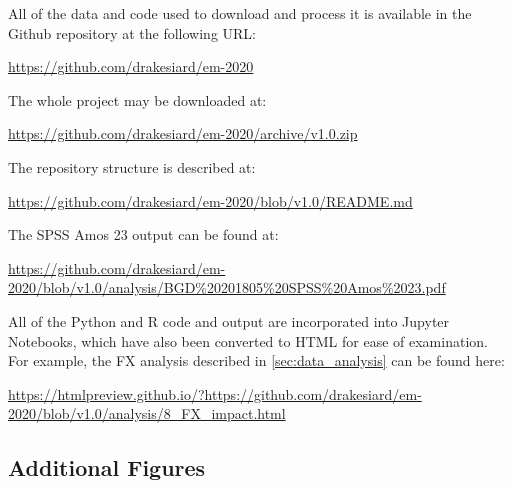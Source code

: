 \documentclass[11pt,a4paper]{article}
\begin{document}
All of the data and code used to download and process it is available in the Github repository at the following URL:

\url{https://github.com/drakesiard/em-2020}

\noindent
The whole project may be downloaded at:

\url{https://github.com/drakesiard/em-2020/archive/v1.0.zip}

\noindent
The repository structure is described at:

\url{https://github.com/drakesiard/em-2020/blob/v1.0/README.md}

\noindent
The SPSS Amos 23 output can be found at:

\begin{adjustbox}{max width=\textwidth}
\url{https://github.com/drakesiard/em-2020/blob/v1.0/analysis/BGD\%20201805\%20SPSS\%20Amos\%2023.pdf}
\end{adjustbox}

\noindent
All of the Python and R code and output are incorporated into Jupyter Notebooks, which have also been converted to HTML for ease of examination. For example, the FX analysis described in \cref{sec:data_analysis} can be found here:

\begin{adjustbox}{max width=\textwidth}
\url{https://htmlpreview.github.io/?https://github.com/drakesiard/em-2020/blob/v1.0/analysis/8_FX_impact.html}
\end{adjustbox}

\subsection{Additional Figures}\label{sec:graph_appendix}

\listoffigures
\listoftables
\end{document}

